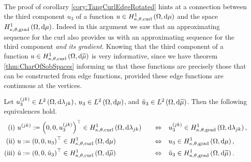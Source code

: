 The proof of corollary \ref{cory:TangCurlEdgeRotated} hints at a connection between the third component $u_3$ of a function $u\in H^1_{\kappa,\theta,\mathrm{curl}}\left( \Omega, \mathrm{d}\mu \right)$ and the space $H^1_{\kappa,\theta,\mathrm{grad}}\left( \Omega, \mathrm{d}\mu \right)$.
Indeed in this argument we saw that an approximating sequence for the curl also provides us with an approximating sequence for the third component \emph{and its gradient}.
Knowing that the third component of a function $u\in H^1_{\kappa,\theta,\mathrm{curl}}\left( \Omega, \mathrm{d}\widetilde{\mu} \right)$ is very informative, since we have theorem \ref{thm:CharOfSobSpaces} informing us that these functions are precisely those that can be constructed from edge functions, provided these edge functions are continuous at the vertices.
\begin{prop} \label{prop:TC-3rdComponentIFF}
	Let $u_3^{(jk)}\in L^{2}\left( \Omega,\mathrm{d} \lambda_{jk} \right)$, $u_3\in L^{2}\left( \Omega,\mathrm{d} \mu \right)$, and $\tilde{u}_3\in L^{2}\left( \Omega,\mathrm{d} \widetilde{\mu} \right)$.
	Then the following equivalences hold.
	\begin{align*}
		\mathrm{(i)} \ &
		u^{(jk)}:= \left( 0,0,u_3^{(jk)} \right)^\top\in H^1_{\kappa,\theta,\mathrm{curl}}\left( \Omega, \mathrm{d}\lambda_{jk} \right)
		\quad &\Leftrightarrow &\quad
		u_3^{(jk)}\in H^1_{\kappa,\theta,\mathrm{grad}}\left( \Omega, \mathrm{d}\lambda_{jk} \right), \\
		\mathrm{(ii)} \ &
		u:= \left( 0,0,u_3 \right)^\top\in H^1_{\kappa,\theta,\mathrm{curl}}\left( \Omega, \mathrm{d}\mu \right)
		\quad &\Leftrightarrow &\quad
		u_3\in H^1_{\kappa,\theta,\mathrm{grad}}\left( \Omega, \mathrm{d}\mu \right), \\
		\mathrm{(iii)} \ &
		\tilde{u} := \left( 0,0,\tilde{u}_3 \right)^\top\in H^1_{\kappa,\theta,\mathrm{curl}}\left( \Omega, \mathrm{d}\widetilde{\mu} \right)
		\quad &\Leftrightarrow &\quad
		\tilde{u}_3\in H^1_{\kappa,\theta,\mathrm{grad}}\left( \Omega, \mathrm{d}\widetilde{\mu} \right).
	\end{align*}
\end{prop}
